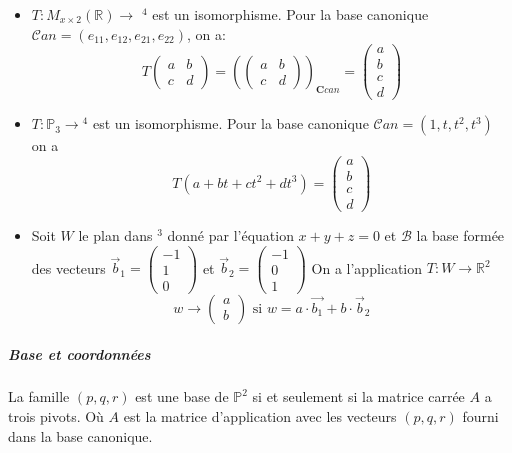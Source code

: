 \begin{exemple}
    \begin{itemize}
        \item $T : M_{x\times2}(\mathbb{R}) \to $ \R$^4$ est un isomorphisme. Pour la base canonique $\mathcal{C}an = (e_{11}, e_{12}, e_{21}, e_{22})$, on a:
\[T\begin{pmatrix}
    a & b \\ c & d
\end{pmatrix} = \left ( \begin{pmatrix}
    a & b \\ c & d
\end{pmatrix}\right )_{\mathbf{C}can} = \begin{pmatrix}
    a \\ b \\ c \\ d
\end{pmatrix}\]
        \item $T : \mathbb{P}_3 \to $\R$^4$ est un isomorphisme. Pour la base canonique $\mathcal{C}an = (1, t, t^2, t^3)$ on a
\[T(a + bt + ct^2 + dt^3) = \begin{pmatrix}
    a \\ b \\ c \\ d
\end{pmatrix}\]
\item Soit $W$ le plan dans \R$^3$ donné par l'équation $x + y + z = 0$ et $\mathcal{B}$ la base formée des vecteurs $\vec{b}_1 = \begin{pmatrix}
    -1 \\ 1 \\ 0
\end{pmatrix}$ et $\vec{b}_2 =  \begin{pmatrix}
    -1 \\ 0 \\ 1
\end{pmatrix}$
On a l'application $T : W \to \mathbb{R}^2$
\[w \to \begin{pmatrix}
    a \\ b
\end{pmatrix} \text{ si } w = a\cdot\vec{b_1} + b\cdot\vec{b}_2\]
\end{itemize}

\end{exemple}


\subparagraph{Base et coordonnées}
\begin{definition}[pivots]
    La famille $(p, q, r)$ est une base de $\mathbb{P}^2$ si et seulement si la matrice carrée $A$ a trois pivots. Où $A$ est la matrice d'application avec les vecteurs $(p, q, r)$ fourni dans la base canonique.
\end{definition}

